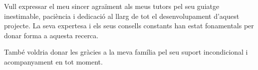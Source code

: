 %

Vull expressar el meu sincer agraïment als meus tutors pel seu guiatge inestimable, paciència i dedicació al llarg de tot el desenvolupament d'aquest projecte. La seva expertesa i els seus consells constants han estat fonamentals per donar forma a aquesta recerca.

També voldria donar les gràcies a la meva família pel seu suport incondicional i acompanyament en tot moment.